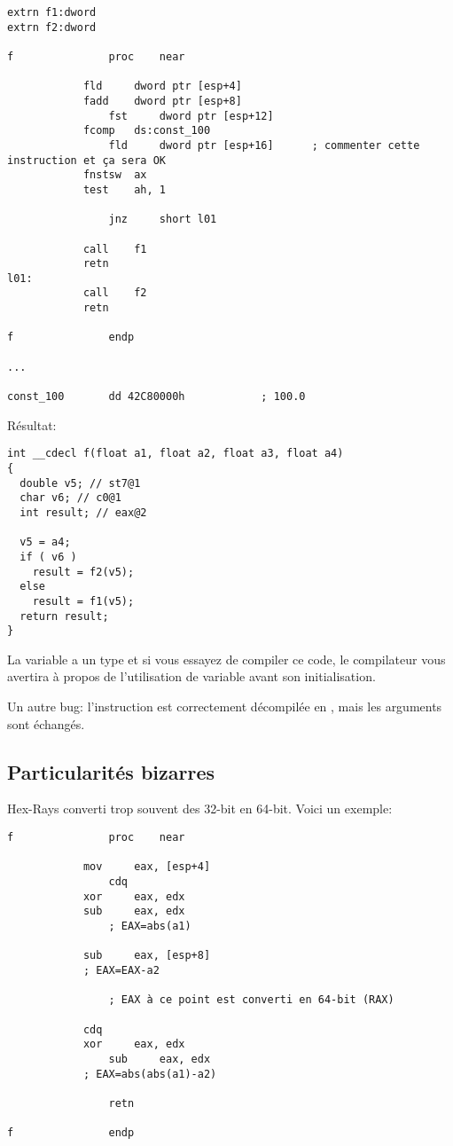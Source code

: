 \begin{lstlisting}
extrn f1:dword
extrn f2:dword

f               proc    near

	        fld     dword ptr [esp+4]
        	fadd    dword ptr [esp+8]
                fst     dword ptr [esp+12]
	        fcomp   ds:const_100
                fld     dword ptr [esp+16]      ; commenter cette instruction et ça sera OK
	        fnstsw  ax
        	test    ah, 1

                jnz     short l01

	        call    f1
        	retn
l01:
	        call    f2
        	retn

f               endp

...

const_100       dd 42C80000h            ; 100.0
\end{lstlisting}

Résultat:

\begin{lstlisting}
int __cdecl f(float a1, float a2, float a3, float a4)
{
  double v5; // st7@1
  char v6; // c0@1
  int result; // eax@2

  v5 = a4;
  if ( v6 )
    result = f2(v5);
  else
    result = f1(v5);
  return result;
}
\end{lstlisting}

La variable  a un type  et si vous essayez de compiler ce code, le
compilateur vous avertira à propos de l'utilisation de variable avant son initialisation.

Un autre bug: l'instruction  est correctement décompilée en ,
mais les arguments sont échangés.

\subsection{Particularités bizarres}

Hex-Rays converti trop souvent des  32-bit en 64-bit.
Voici un exemple:

\begin{lstlisting}
f               proc    near

	        mov     eax, [esp+4]
                cdq
	        xor     eax, edx
        	sub     eax, edx
                ; EAX=abs(a1)

	        sub     eax, [esp+8]
        	; EAX=EAX-a2

                ; EAX à ce point est converti en 64-bit (RAX)

	        cdq
        	xor     eax, edx
                sub     eax, edx
	        ; EAX=abs(abs(a1)-a2)

                retn

f               endp
\end{lstlisting}

